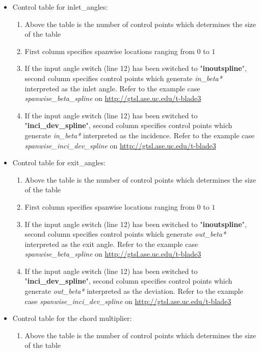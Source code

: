\documentclass[8pt]{article}
\begin{document}
\begin{itemize}[leftmargin=*]
\begin{enumerate}[label=\alph*]
    \end{enumerate}
    \item Control table for inlet\_angles:
    \begin{enumerate}[label=\alph*]
        \item Above the table is the number of control points which determines the size of the table
        \item First column specifies spanwise locations ranging from $0$ to $1$
        \item If the input angle switch (line 12) has been switched to "\textbf{inoutspline}", second column specifies control points which generate \textit{in\_beta*} interpreted as the inlet angle. Refer to the example case \textit{spanwise\_beta\_spline} on \url{http://gtsl.ase.uc.edu/t-blade3}
        \item If the input angle switch (line 12) has been switched to "\textbf{inci\_dev\_spline}", second column specifies control points which generate \textit{in\_beta*} interpreted as the incidence. Refer to the example case \textit{spanwise\_inci\_dev\_spline} on \url{http://gtsl.ase.uc.edu/t-blade3}
    \end{enumerate}
    \item Control table for exit\_angles:
    \begin{enumerate}[label=\alph*]
        \item Above the table is the number of control points which determines the size of the table
        \item First column specifies spanwise locations ranging from $0$ to $1$
        \item If the input angle switch (line 12) has been switched to "\textbf{inoutspline}", second column specifies control points which generate \textit{out\_beta*} interpreted as the exit angle. Refer to the example case \textit{spanwise\_beta\_spline} on \url{http://gtsl.ase.uc.edu/t-blade3}
        \item If the input angle switch (line 12) has been switched to "\textbf{inci\_dev\_spline}", second column specifies control points which generate \textit{out\_beta*} interpreted as the deviation. Refer to the example case \textit{spanwise\_inci\_dev\_spline} on \url{http://gtsl.ase.uc.edu/t-blade3}
    \end{enumerate}
    \item Control table for the chord multiplier:
    \begin{enumerate}[label=\alph*]
        \item Above the table is the number of control points which determines the size of the table

\end{enumerate}
\end{itemize}
\end{document}
